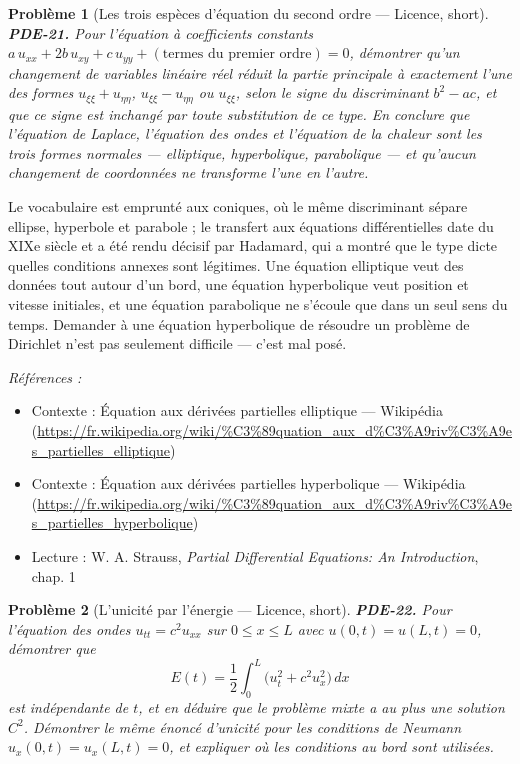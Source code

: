 \documentclass[11pt]{article}
\newtheorem{problem}{Problème}
\newenvironment{refs}{\par\small\noindent\emph{Références :}\begin{itemize}\setlength\itemsep{0pt}}{\end{itemize}\normalsize}
\begin{document}
\bigskip

\begin{problem}[{Les trois espèces d'équation du second ordre --- Licence, short}]
\textbf{PDE-21.} Pour l'équation à coefficients constants
$a\,u_{xx} + 2b\,u_{xy} + c\,u_{yy} + (\text{termes du premier ordre}) = 0$, démontrer qu'un
changement de variables linéaire réel réduit la partie principale à exactement l'une des formes
$u_{\xi\xi} + u_{\eta\eta}$, $u_{\xi\xi} - u_{\eta\eta}$ ou $u_{\xi\xi}$,
selon le signe du discriminant $b^2 - ac$, et que ce signe est
inchangé par toute substitution de ce type. En conclure que l'équation de Laplace, l'équation
des ondes et l'équation de la chaleur sont les trois formes normales --- elliptique, hyperbolique,
parabolique --- et qu'aucun changement de coordonnées ne transforme l'une en l'autre.
\end{problem}

\noindent Le vocabulaire est emprunté aux coniques, où le même
discriminant sépare ellipse, hyperbole et parabole ; le transfert aux
équations différentielles date du XIXe siècle et a été rendu décisif par
Hadamard, qui a montré que le type dicte quelles conditions annexes sont légitimes.
Une équation elliptique veut des données tout autour d'un bord, une équation hyperbolique veut
position et vitesse initiales, et une équation parabolique ne s'écoule que dans un seul sens du
temps. Demander à une équation hyperbolique de résoudre un problème de Dirichlet n'est pas
seulement difficile --- c'est mal posé.

\begin{refs}
\item Contexte : Équation aux dérivées partielles elliptique --- Wikipédia (\url{https://fr.wikipedia.org/wiki/%C3%89quation_aux_d%C3%A9riv%C3%A9es_partielles_elliptique})
\item Contexte : Équation aux dérivées partielles hyperbolique --- Wikipédia (\url{https://fr.wikipedia.org/wiki/%C3%89quation_aux_d%C3%A9riv%C3%A9es_partielles_hyperbolique})
\item Lecture : W. A. Strauss, \textit{Partial Differential Equations: An Introduction}, chap. 1
\end{refs}

\bigskip

\begin{problem}[{L'unicité par l'énergie --- Licence, short}]
\textbf{PDE-22.} Pour l'équation des ondes $u_{tt} = c^2 u_{xx}$
sur $0 \le x \le L$ avec $u(0,t) = u(L,t) = 0$, démontrer que
\[ E(t) = \frac12\int_0^L \bigl(u_t^2 + c^2 u_x^2\bigr)\,dx \]
est indépendante de $t$, et en déduire que le problème mixte a au plus une solution
$C^2$. Démontrer le même énoncé d'unicité pour les conditions de Neumann
$u_x(0,t) = u_x(L,t) = 0$, et expliquer où les conditions au bord
sont utilisées.
\end{problem}
\end{document}
